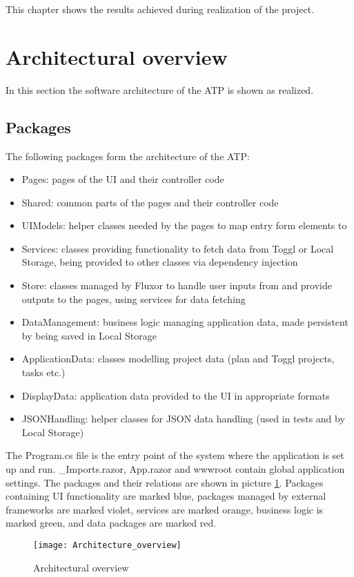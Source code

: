 
This chapter shows the results achieved during realization of the project.

\section{Architectural overview} \label{Architecture}
In this section the software architecture of the ATP is shown as realized.

\subsection{Packages}
The following packages form the architecture of the ATP:
\begin{itemize}
	\item Pages: pages of the UI and their controller code
	\item Shared: common parts of the pages and their controller code
	\item UIModels: helper classes needed by the pages to map entry form elements to
	\item Services: classes providing functionality to fetch data from Toggl or Local Storage, being provided to other classes via dependency injection
	\item Store: classes managed by Fluxor to handle user inputs from and provide outputs to the pages, using services for data fetching
	\item DataManagement: business logic managing application data, made persistent by being saved in Local Storage
	\item ApplicationData: classes modelling project data (plan and Toggl projects, tasks etc.)
	\item DisplayData: application data provided to the UI in appropriate formats
	\item JSONHandling: helper classes for JSON data handling (used in tests and by Local Storage)
\end{itemize}
The Program.cs file is the entry point of the system where the application is set up and run. \_Imports.razor, App.razor and wwwroot contain global application settings. The packages and their relations are shown in picture \ref{architecture_overview}. Packages containing UI functionality are marked blue, packages managed by external frameworks are marked violet, services are marked orange, business logic is marked green, and data packages are marked red.
\begin{figure}[H]
	\centering
	\texttt{[image: Architecture\_overview]}
	\caption{Architectural overview}
	\label{architecture_overview}
\end{figure}

